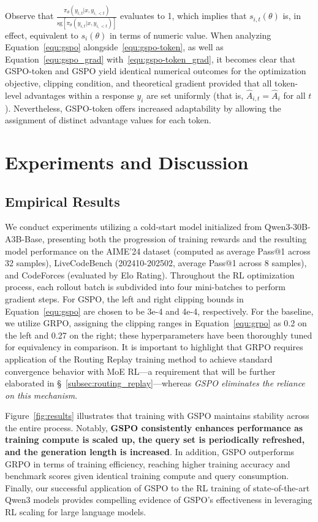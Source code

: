 Observe that $\frac{ \pi_{\theta} (y_{i,t} | x, y_{i,<t}) }{ \mathrm{sg} \left[ \pi_{\theta} (y_{i,t} | x, y_{i,<t}) \right] }$ evaluates to 1, which implies that $s_{i,t}(\theta)$ is, in effect, equivalent to $s_{i}(\theta)$ in terms of numeric value.
When analyzing Equation~\eqref{equ:gspo} alongside~\eqref{equ:gspo-token}, as well as Equation~\eqref{equ:gspo_grad} with~\eqref{equ:gspo-token_grad}, it becomes clear that GSPO-token and GSPO yield identical numerical outcomes for the optimization objective, clipping condition, and theoretical gradient provided that all token-level advantages within a response $y_i$ are set uniformly (that is, $\widehat{A}_{i,t} = \widehat{A}_{i}$ for all $t$). Nevertheless, GSPO-token offers increased adaptability by allowing the assignment of distinct advantage values for each token.

\section{Experiments and Discussion}

\subsection{Empirical Results}

We conduct experiments utilizing a cold-start model initialized from Qwen3-30B-A3B-Base, presenting both the progression of training rewards and the resulting model performance on the AIME'24 dataset (computed as average Pass@1 across 32 samples), LiveCodeBench (202410-202502, average Pass@1 across 8 samples), and CodeForces (evaluated by Elo Rating). Throughout the RL optimization process, each rollout batch is subdivided into four mini-batches to perform gradient steps. For GSPO, the left and right clipping bounds in Equation~\eqref{equ:gspo} are chosen to be 3e-4 and 4e-4, respectively. For the baseline, we utilize GRPO, assigning the clipping ranges in Equation~\eqref{equ:grpo} as 0.2 on the left and 0.27 on the right; these hyperparameters have been thoroughly tuned for equivalency in comparison. It is important to highlight that GRPO requires application of the Routing Replay training method to achieve standard convergence behavior with MoE RL—a requirement that will be further elaborated in \S~\ref{subsec:routing_replay}—whereas \textit{GSPO eliminates the reliance on this mechanism}.

Figure~\ref{fig:results} illustrates that training with GSPO maintains stability across the entire process. Notably, \textbf{GSPO consistently enhances performance as training compute is scaled up, the query set is periodically refreshed, and the generation length is increased}. In addition, GSPO outperforms GRPO in terms of training efficiency, reaching higher training accuracy and benchmark scores given identical training compute and query consumption. Finally, our successful application of GSPO to the RL training of state-of-the-art Qwen3 models provides compelling evidence of GSPO’s effectiveness in leveraging RL scaling for large language models.

